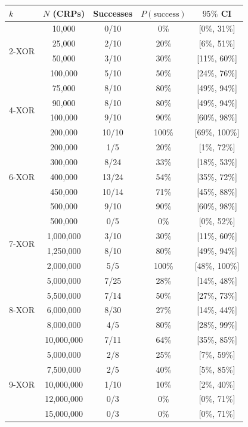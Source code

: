 \begin{tabular}{lcccc}
\toprule
$k$ & $N$ (CRPs) & Successes & $P(\text{success})$ & $95\%$ CI \\
\midrule
\multirow{4}{*}{2-XOR}
  & 10{,}000   & 0/10  & 0\%    & {[}0\%, 31\%{]} \\
  & 25{,}000   & 2/10  & 20\%   & {[}6\%, 51\%{]} \\
  & 50{,}000   & 3/10  & 30\%   & {[}11\%, 60\%{]} \\
  & 100{,}000  & 5/10  & 50\%   & {[}24\%, 76\%{]} \\
\midrule
\multirow{4}{*}{4-XOR}
  & 75{,}000   & 8/10  & 80\%   & {[}49\%, 94\%{]} \\
  & 90{,}000   & 8/10  & 80\%   & {[}49\%, 94\%{]} \\
  & 100{,}000  & 9/10  & 90\%   & {[}60\%, 98\%{]} \\
  & 200{,}000  & 10/10 & 100\%  & {[}69\%, 100\%{]} \\
\midrule
\multirow{5}{*}{6-XOR}
  & 200{,}000  & 1/5   & 20\%   & {[}1\%, 72\%{]} \\
  & 300{,}000  & 8/24  & 33\%   & {[}18\%, 53\%{]} \\
  & 400{,}000  & 13/24 & 54\%   & {[}35\%, 72\%{]} \\
  & 450{,}000  & 10/14 & 71\%   & {[}45\%, 88\%{]} \\
  & 500{,}000  & 9/10  & 90\%   & {[}60\%, 98\%{]} \\
\midrule
\multirow{4}{*}{7-XOR}
  & 500{,}000    & 0/5   & 0\%    & {[}0\%, 52\%{]} \\
  & 1{,}000{,}000  & 3/10  & 30\%   & {[}11\%, 60\%{]} \\
  & 1{,}250{,}000  & 8/10  & 80\%   & {[}49\%, 94\%{]} \\
  & 2{,}000{,}000  & 5/5   & 100\%  & {[}48\%, 100\%{]} \\
\midrule
\multirow{5}{*}{8-XOR}
  & 5{,}000{,}000  & 7/25  & 28\%   & {[}14\%, 48\%{]} \\
  & 5{,}500{,}000  & 7/14  & 50\%   & {[}27\%, 73\%{]} \\
  & 6{,}000{,}000  & 8/30  & 27\%   & {[}14\%, 44\%{]} \\
  & 8{,}000{,}000  & 4/5   & 80\%   & {[}28\%, 99\%{]} \\
  & 10{,}000{,}000 & 7/11  & 64\%   & {[}35\%, 85\%{]}  \\
\midrule
\multirow{5}{*}{9-XOR}
  & 5{,}000{,}000  & 2/8   & 25\%   & {[}7\%, 59\%{]} \\
  & 7{,}500{,}000  & 2/5   & 40\%   & {[}5\%, 85\%{]} \\
  & 10{,}000{,}000 & 1/10  & 10\%   & {[}2\%, 40\%{]} \\
  & 12{,}000{,}000 & 0/3   & 0\%    & {[}0\%, 71\%{]} \\
  & 15{,}000{,}000 & 0/3   & 0\%    & {[}0\%, 71\%{]} \\
\bottomrule
\end{tabular}
\tablefloatend

